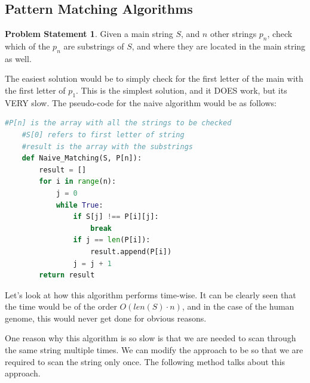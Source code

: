 \documentclass{article}
\theoremstyle{definition}
\theoremstyle{example}
\newtheorem*{example}{Problem Statement}
\begin{document}
\subsection{\Large Pattern Matching Algorithms}

\theoremstyle{example}
\begin{example}
    Given a main string $S$, and $n$ other strings $p_n$, check which of the $p_n$ are substrings of $S$, and where they are located in the main string as well.
\end{example}

The easiest solution would be to simply check for the first letter of the main with the first letter of $p_1$. This is the simplest solution, and it DOES work, but its VERY slow. The pseudo-code for the naive algorithm would be as follows:
\newpage
\begin{lstlisting}[language = python, basicstyle = \Large]
    #P[n] is the array with all the strings to be checked
    #S[0] refers to first letter of string
    #result is the array with the substrings
    def Naive_Matching(S, P[n]):
        result = []
        for i in range(n):
            j = 0
            while True:
                if S[j] !== P[i][j]:
                    break
                if j == len(P[i]):
                    result.append(P[i])
                j = j + 1
        return result

\end{lstlisting}
\vspace{4mm}
\hspace{4mm}Let's look at how this algorithm performs time-wise. It can be clearly seen that the time would be of the order $O(len(S)\cdot n)$, and in the case of the human genome, this would never get done for obvious reasons. \par
\vspace{4mm}
One reason why this algorithm is so slow is that we are needed to scan through the same string multiple times. We can modify the approach to be so that we are required to scan the string only once. The following method talks about this approach.
\end{document}
